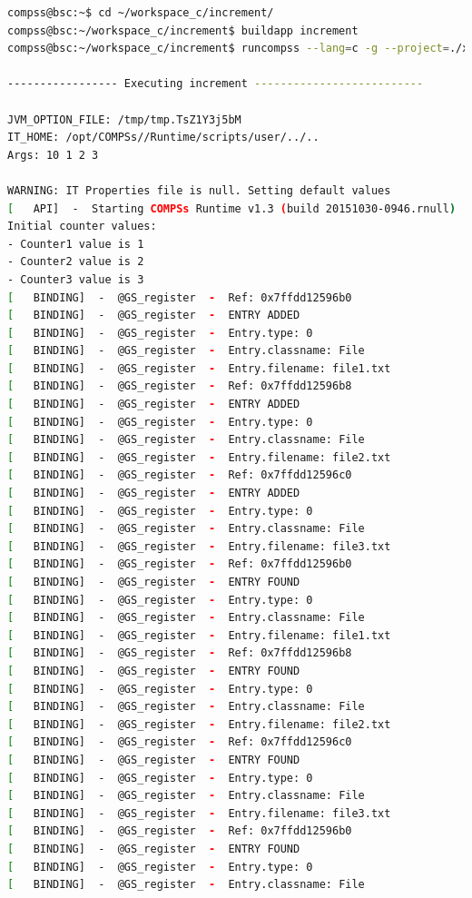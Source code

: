 \begin{lstlisting}[language=bash]
compss@bsc:~$ cd ~/workspace_c/increment/
compss@bsc:~/workspace_c/increment$ buildapp increment
compss@bsc:~/workspace_c/increment$ runcompss --lang=c -g --project=./xml/project.xml --resources=./xml/resources.xml ~/workspace_c/increment/master/increment 10 1 2 3

----------------- Executing increment --------------------------

JVM_OPTION_FILE: /tmp/tmp.TsZ1Y3j5bM 
IT_HOME: /opt/COMPSs//Runtime/scripts/user/../.. 
Args: 10 1 2 3 

WARNING: IT Properties file is null. Setting default values
[   API]  -  Starting COMPSs Runtime v1.3 (build 20151030-0946.rnull)
Initial counter values: 
- Counter1 value is 1
- Counter2 value is 2
- Counter3 value is 3
[   BINDING]  -  @GS_register  -  Ref: 0x7ffdd12596b0
[   BINDING]  -  @GS_register  -  ENTRY ADDED
[   BINDING]  -  @GS_register  -  Entry.type: 0
[   BINDING]  -  @GS_register  -  Entry.classname: File
[   BINDING]  -  @GS_register  -  Entry.filename: file1.txt
[   BINDING]  -  @GS_register  -  Ref: 0x7ffdd12596b8
[   BINDING]  -  @GS_register  -  ENTRY ADDED
[   BINDING]  -  @GS_register  -  Entry.type: 0
[   BINDING]  -  @GS_register  -  Entry.classname: File
[   BINDING]  -  @GS_register  -  Entry.filename: file2.txt
[   BINDING]  -  @GS_register  -  Ref: 0x7ffdd12596c0
[   BINDING]  -  @GS_register  -  ENTRY ADDED
[   BINDING]  -  @GS_register  -  Entry.type: 0
[   BINDING]  -  @GS_register  -  Entry.classname: File
[   BINDING]  -  @GS_register  -  Entry.filename: file3.txt
[   BINDING]  -  @GS_register  -  Ref: 0x7ffdd12596b0
[   BINDING]  -  @GS_register  -  ENTRY FOUND
[   BINDING]  -  @GS_register  -  Entry.type: 0
[   BINDING]  -  @GS_register  -  Entry.classname: File
[   BINDING]  -  @GS_register  -  Entry.filename: file1.txt
[   BINDING]  -  @GS_register  -  Ref: 0x7ffdd12596b8
[   BINDING]  -  @GS_register  -  ENTRY FOUND
[   BINDING]  -  @GS_register  -  Entry.type: 0
[   BINDING]  -  @GS_register  -  Entry.classname: File
[   BINDING]  -  @GS_register  -  Entry.filename: file2.txt
[   BINDING]  -  @GS_register  -  Ref: 0x7ffdd12596c0
[   BINDING]  -  @GS_register  -  ENTRY FOUND
[   BINDING]  -  @GS_register  -  Entry.type: 0
[   BINDING]  -  @GS_register  -  Entry.classname: File
[   BINDING]  -  @GS_register  -  Entry.filename: file3.txt
[   BINDING]  -  @GS_register  -  Ref: 0x7ffdd12596b0
[   BINDING]  -  @GS_register  -  ENTRY FOUND
[   BINDING]  -  @GS_register  -  Entry.type: 0
[   BINDING]  -  @GS_register  -  Entry.classname: File

\end{lstlisting}
